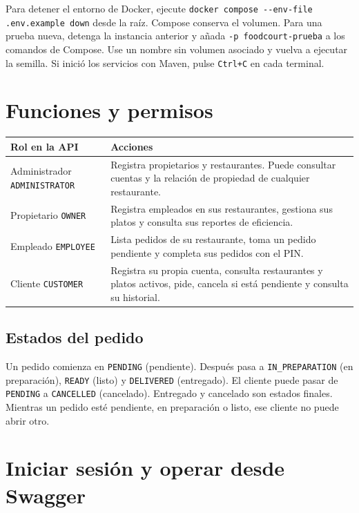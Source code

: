 \documentclass[11pt,a4paper]{article}
\newcommand{\code}[1]{\nolinkurl{#1}}
\begin{document}
Para detener el entorno de Docker, ejecute \code{docker compose --env-file .env.example down} desde la raíz. Compose conserva el volumen. Para una prueba nueva, detenga la instancia anterior y añada \code{-p foodcourt-prueba} a los comandos de Compose. Use un nombre sin volumen asociado y vuelva a ejecutar la semilla. Si inició los servicios con Maven, pulse \code{Ctrl+C} en cada terminal.

\section{Funciones y permisos}\label{sec:roles}
\begin{minipage}{\linewidth}
\begin{tabularx}{\linewidth}{@{}P{45mm}Y@{}}
\toprule
Rol en la API & Acciones \\
\midrule
Administrador \code{ADMINISTRATOR} & Registra propietarios y restaurantes. Puede consultar cuentas y la relación de propiedad de cualquier restaurante. \\
Propietario \code{OWNER} & Registra empleados en sus restaurantes, gestiona sus platos y consulta sus reportes de eficiencia. \\
Empleado \code{EMPLOYEE} & Lista pedidos de su restaurante, toma un pedido pendiente y completa sus pedidos con el PIN. \\
Cliente \code{CUSTOMER} & Registra su propia cuenta, consulta restaurantes y platos activos, pide, cancela si está pendiente y consulta su historial. \\
\bottomrule
\end{tabularx}
\end{minipage}

\subsection{Estados del pedido}
Un pedido comienza en \code{PENDING} (pendiente). Después pasa a \code{IN_PREPARATION} (en preparación), \code{READY} (listo) y \code{DELIVERED} (entregado). El cliente puede pasar de \code{PENDING} a \code{CANCELLED} (cancelado). Entregado y cancelado son estados finales. Mientras un pedido esté pendiente, en preparación o listo, ese cliente no puede abrir otro.

\clearpage
\section{Iniciar sesión y operar desde Swagger}\label{sec:sesion}
\end{document}
